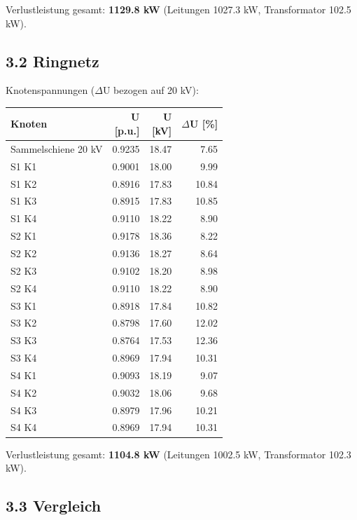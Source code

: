 \documentclass[11pt,a4paper]{article}
\begin{document}
Verlustleistung gesamt: \textbf{1129.8 kW} (Leitungen 1027.3 kW, Transformator 102.5 kW).

\subsection{3.2 Ringnetz}

Knotenspannungen ($\Delta$U bezogen auf 20 kV):

\begin{table}[H]
\centering
\begin{adjustbox}{max width=\linewidth}
\begin{tabular}{lrrr}
\toprule
\textbf{Knoten} & \thead{U \\ {[p.u.]}} & \thead{U \\ {[kV]}} & \thead{$\Delta$U \\ {[\%]}} \\
\midrule
Sammelschiene 20 kV & 0.9235 & 18.47 & 7.65 \\
S1 K1 & 0.9001 & 18.00 & 9.99 \\
S1 K2 & 0.8916 & 17.83 & 10.84 \\
S1 K3 & 0.8915 & 17.83 & 10.85 \\
S1 K4 & 0.9110 & 18.22 & 8.90 \\
S2 K1 & 0.9178 & 18.36 & 8.22 \\
S2 K2 & 0.9136 & 18.27 & 8.64 \\
S2 K3 & 0.9102 & 18.20 & 8.98 \\
S2 K4 & 0.9110 & 18.22 & 8.90 \\
S3 K1 & 0.8918 & 17.84 & 10.82 \\
S3 K2 & 0.8798 & 17.60 & 12.02 \\
S3 K3 & 0.8764 & 17.53 & 12.36 \\
S3 K4 & 0.8969 & 17.94 & 10.31 \\
S4 K1 & 0.9093 & 18.19 & 9.07 \\
S4 K2 & 0.9032 & 18.06 & 9.68 \\
S4 K3 & 0.8979 & 17.96 & 10.21 \\
S4 K4 & 0.8969 & 17.94 & 10.31 \\
\bottomrule
\end{tabular}
\end{adjustbox}
\end{table}

Verlustleistung gesamt: \textbf{1104.8 kW} (Leitungen 1002.5 kW, Transformator 102.3 kW).

\subsection{3.3 Vergleich}
\end{document}
